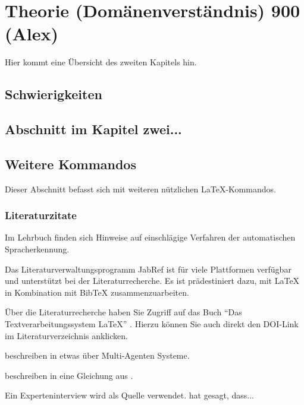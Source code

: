 \chapter{Theorie (Domänenverständnis) 900 (Alex)}
\label{sec:Theorie}

Hier kommt eine Übersicht des zweiten Kapitels hin.

\section{Schwierigkeiten}
\label{sec:Schwierigkeiten}

\section{Abschnitt im Kapitel zwei...}
%
%

\section{Weitere Kommandos}
Dieser Abschnitt befasst sich mit weiteren nützlichen \LaTeX-Kommandos.

\subsection{Literaturzitate}
\label{sec:literaturzitate}

Im Lehrbuch \autocite{Schukat-Talamazzini1995}
finden sich Hinweise auf einschlägige Verfahren der automatischen Spracherkennung.

Das Literaturverwaltungsprogramm JabRef \autocite{Kopp2018} ist für viele Plattformen verfügbar und unterstützt bei der Literaturrecherche. Es ist prädestiniert dazu, mit {\LaTeX} in Kombination mit {Bib\TeX} zusammenzuarbeiten.

Über die Literaturrecherche haben Sie Zugriff auf das Buch "`Das Textverarbeitungssystem LaTeX"' \autocite[S. 15]{Oechsner2015}. Hierzu können Sie auch direkt den DOI-Link im Literaturverzeichnis anklicken.

\citeauthor{TyrinMultiAgent2012} beschreiben in \autocite{TyrinMultiAgent2012} etwas über Multi-Agenten Systeme. 

\citeauthor{Ghazali2012} beschreiben in \autocite{Ghazali2012} eine Gleichung aus \autocite{moore2007basic}.

Ein Experteninterview wird als Quelle verwendet. \citeauthor{Interviewpartnerin2021} hat gesagt, dass... \autocite[Aussage-Nr]{Interviewpartnerin2021}

